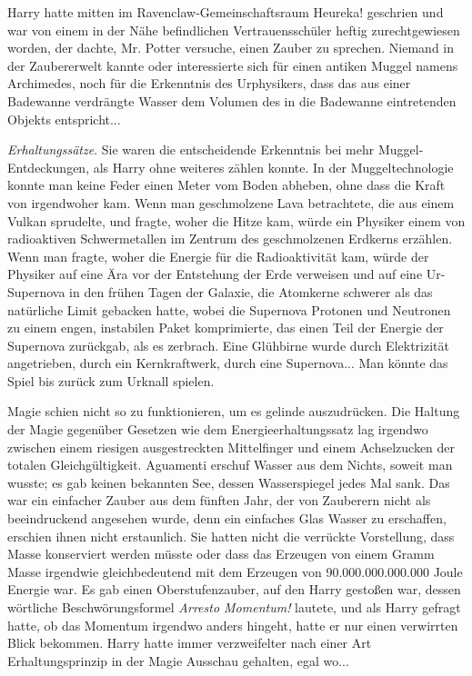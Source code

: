 Harry hatte mitten im Ravenclaw-Gemeinschaftsraum \glqq Heureka!\grqq{}
geschrien und war von einem in der Nähe befindlichen Vertrauensschüler heftig
zurechtgewiesen worden, der dachte, Mr. Potter versuche, einen Zauber zu
sprechen. Niemand in der Zaubererwelt kannte oder interessierte sich für einen
antiken Muggel namens Archimedes, noch für die Erkenntnis des Urphysikers, dass
das aus einer Badewanne verdrängte Wasser dem Volumen des in die Badewanne
eintretenden Objekts entspricht...

\emph{Erhaltungssätze}. Sie waren die entscheidende Erkenntnis bei mehr
Muggel-Entdeckungen, als Harry ohne weiteres zählen konnte. In der
Muggeltechnologie konnte man keine Feder einen Meter vom Boden abheben, ohne
dass die Kraft von irgendwoher kam. Wenn man geschmolzene Lava betrachtete, die
aus einem Vulkan sprudelte, und fragte, woher die Hitze kam, würde ein Physiker
einem von radioaktiven Schwermetallen im Zentrum des geschmolzenen Erdkerns
erzählen. Wenn man fragte, woher die Energie für die Radioaktivität kam, würde
der Physiker auf eine Ära vor der Entstehung der Erde verweisen und auf eine
Ur-Supernova in den frühen Tagen der Galaxie, die Atomkerne schwerer als das
natürliche Limit gebacken hatte, wobei die Supernova Protonen und Neutronen zu
einem engen, instabilen Paket komprimierte, das einen Teil der Energie der
Supernova zurückgab, als es zerbrach. Eine Glühbirne wurde durch Elektrizität
angetrieben, durch ein Kernkraftwerk, durch eine Supernova... Man könnte das
Spiel bis zurück zum Urknall spielen.

Magie schien nicht so zu funktionieren, um es gelinde auszudrücken. Die Haltung
der Magie gegenüber Gesetzen wie dem Energieerhaltungssatz lag irgendwo zwischen
einem riesigen ausgestreckten Mittelfinger und einem Achselzucken der totalen
Gleichgültigkeit. Aguamenti erschuf Wasser aus dem Nichts, soweit man wusste; es
gab keinen bekannten See, dessen Wasserspiegel jedes Mal sank. Das war ein
einfacher Zauber aus dem fünften Jahr, der von Zauberern nicht als beeindruckend
angesehen wurde, denn ein einfaches Glas Wasser zu erschaffen, erschien ihnen
nicht erstaunlich. Sie hatten nicht die verrückte Vorstellung, dass Masse
konserviert werden müsste oder dass das Erzeugen von einem Gramm Masse irgendwie
gleichbedeutend mit dem Erzeugen von 90.000.000.000.000 Joule Energie war. Es
gab einen Oberstufenzauber, auf den Harry gestoßen war, dessen wörtliche
Beschwörungsformel \glqq \emph{Arresto Momentum!}\grqq{} lautete, und als Harry
gefragt hatte, ob das Momentum irgendwo anders hingeht, hatte er nur einen
verwirrten Blick bekommen. Harry hatte immer verzweifelter nach einer Art
Erhaltungsprinzip in der Magie Ausschau gehalten, egal wo...

